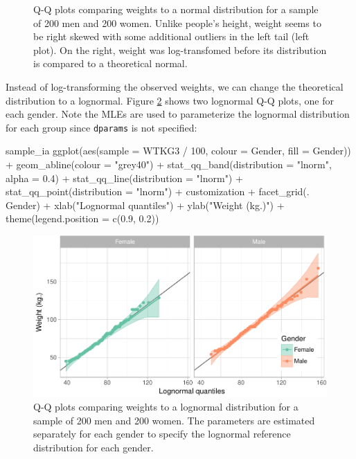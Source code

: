 \begin{Schunk}
\begin{figure}
{}

\caption[Q-Q plots comparing weights to a normal distribution for a sample of 200 men and 200 women]{Q-Q plots comparing weights to a normal distribution for a sample of 200 men and 200 women. Unlike people's height, weight seems to be right skewed with some additional outliers in the left tail (left plot). On the right, weight was log-transfomed before its distribution is compared to a theoretical normal.}\label{fig:weights}
\end{figure}
\end{Schunk}

Instead of log-transforming the observed weights, we can change the
theoretical distribution to a lognormal. Figure \ref{fig:weights-log}
shows two lognormal Q-Q plots, one for each gender. Note the MLEs are
used to parameterize the lognormal distribution for each group since
\texttt{dparams} is not specified:

\begin{Schunk}
\begin{Sinput}
sample_ia %
  ggplot(aes(sample = WTKG3 / 100, colour = Gender, fill = Gender)) +
  geom_abline(colour = "grey40") +
  stat_qq_band(distribution = "lnorm", alpha = 0.4) +
  stat_qq_line(distribution = "lnorm") +
  stat_qq_point(distribution = "lnorm") +
  customization +
  facet_grid(. ~ Gender) +
  xlab("Lognormal quantiles") +
  ylab("Weight (kg.)") +
  theme(legend.position = c(0.9, 0.2))
\end{Sinput}
\begin{figure}

{\centering \includegraphics[width=0.9\linewidth]{loy-figures/weights-log-1} 

}

\caption[Q-Q plots comparing weights to a lognormal distribution for a sample of 200 men and 200 women]{Q-Q plots comparing weights to a lognormal distribution for a sample of 200 men and 200 women. The parameters are estimated separately for each gender to specify the lognormal reference distribution for each gender.}\label{fig:weights-log}
\end{figure}
\end{Schunk}

